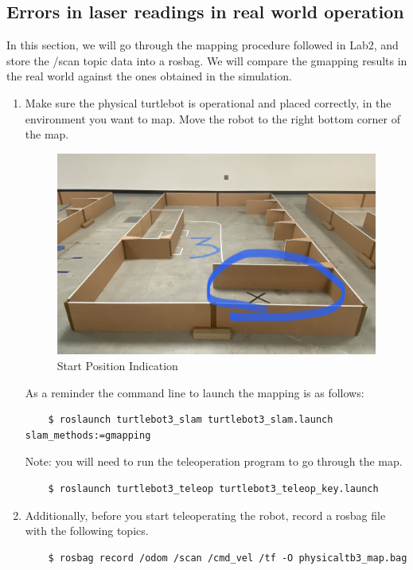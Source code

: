 \documentclass[12pt]{article}
\begin{document}
\subsection{Errors in laser readings in real world operation}
In this section, we will go through the mapping procedure followed in Lab2, and store the /scan topic data into a rosbag. We will compare the gmapping results in the real world against the ones obtained in the simulation.

\begin{enumerate}
    \item Make sure the physical turtlebot is operational and placed correctly, in the environment you want to map. Move the robot to the right bottom corner of the map. 
    \begin{figure}[H]
    \vspace{-10pt}
    \centering\includegraphics[width=14cm]{images/map.jpeg}\vspace{-10pt}
    \caption{Start Position Indication}\label{fig:pid}
    \end{figure}
    
    As a reminder the command line to launch the mapping is as follows:
    \begin{verbatim}
    $ roslaunch turtlebot3_slam turtlebot3_slam.launch slam_methods:=gmapping
    \end{verbatim}
    Note: you will need to run the teleoperation program to go through the map.
    \begin{verbatim}
    $ roslaunch turtlebot3_teleop turtlebot3_teleop_key.launch
    \end{verbatim}
    \item Additionally, before you start teleoperating the robot, record a rosbag file with the following topics.
    \begin{verbatim}
    $ rosbag record /odom /scan /cmd_vel /tf -O physicaltb3_map.bag
    \end{verbatim}
    

\end{enumerate}
\end{document}
